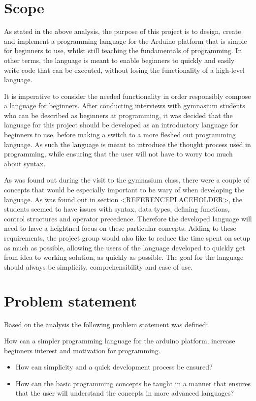 \section{Scope}
As stated in the above analysis, the purpose of this project is to design, create and implement a
programming language for the Arduino platform that is simple for beginners to use, whilst still teaching the
fundamentals of programming.
In other terms, the language is meant to enable beginners to quickly and easily write
code that can be executed, without losing the functionality of a high-level language.

It is imperative to consider the needed functionality in order responsibly compose a language for
beginners.
After conducting interviews with gymnasium students who can be described as beginners at programming,
it was decided that the language for this project should be developed as an introductory language for beginners to use, before making a switch to a more fleshed out programming language.
As such the language is meant to introduce the thought process used in programming, while ensuring that the user will not have to worry too much about syntax.

As was found out during the visit to the gymnasium class, there were a couple of concepts that would be especially important to be wary of when developing the language.
As was found out in section <REFERENCEPLACEHOLDER>, the students seemed to have issues with syntax, data types, defining functions, control structures and operator precedence.
Therefore the developed language will need to have a heightned focus on these particular concepts. 
Adding to these requirements, the project group would also like to reduce the time spent on setup as much as possible, allowing the users of the language developed to quickly get from idea to working solution, as quickly as possible.
The goal for the language should always be simplicity, comprehensibility and ease of use.

\section{Problem statement}
Based on the analysis the following problem statement was defined:
\begin{center}
	How can a simpler programming language for the arduino platform, increase beginners interest and motivation for programming.
\end{center}
\begin{itemize}
	\item How can simplicity and a quick development process be ensured?
	\item How can the basic programming concepts be taught in a manner that ensures that the user will understand the concepts in more advanced languages?
\end{itemize}

 